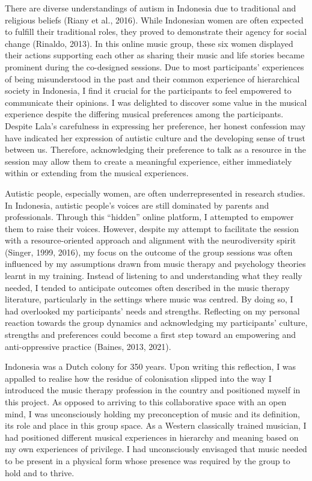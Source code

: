 \documentclass[authordate, empirical, issue]{jote-new-article}
\begin{document}
There are diverse understandings of autism in Indonesia due to traditional and religious beliefs (Riany et al., 2016). While Indonesian women are often expected to fulfill their traditional roles, they proved to demonstrate their agency for social change (Rinaldo, 2013). In this online music group, these six women displayed their actions supporting each other as sharing their music and life stories became prominent during the co-designed sessions. Due to most participants' experiences of being misunderstood in the past and their common experience of hierarchical society in Indonesia, I find it crucial for the participants to feel empowered to communicate their opinions. I was delighted to discover some value in the musical experience despite the differing musical preferences among the participants. Despite Lala's carefulness in expressing her preference, her honest confession may have indicated her expression of autistic culture and the developing sense of trust between us. Therefore, acknowledging their preference to talk as a resource in the session may allow them to create a meaningful experience, either immediately within or extending from the musical experiences.



Autistic people, especially women, are often underrepresented in research studies. In Indonesia, autistic people's voices are still dominated by parents and professionals. Through this “hidden” online platform, I attempted to empower them to raise their voices. However, despite my attempt to facilitate the session with a resource-oriented approach and alignment with the neurodiversity spirit (Singer, 1999, 2016), my focus on the outcome of the group sessions was often influenced by my assumptions drawn from music therapy and psychology theories learnt in my training. Instead of listening to and understanding what they really needed, I tended to anticipate outcomes often described in the music therapy literature, particularly in the settings where music was centred. By doing so, I had overlooked my participants' needs and strengths. Reflecting on my personal reaction towards the group dynamics and acknowledging my participants' culture, strengths and preferences could become a first step toward an empowering and anti-oppressive practice (Baines, 2013, 2021).



Indonesia was a Dutch colony for 350 years. Upon writing this reflection, I was appalled to realise how the residue of colonisation slipped into the way I introduced the music therapy profession in the country and positioned myself in this project. As opposed to arriving to this collaborative space with an open mind, I was unconsciously holding my preconception of music and its definition, its role and place in this group space. As a Western classically trained musician, I had positioned different musical experiences in hierarchy and meaning based on my own experiences of privilege. I had unconsciously envisaged that music needed to be present in a physical form whose presence was required by the group to hold and to thrive.
\end{document}
